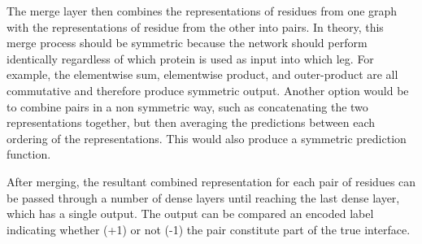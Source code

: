The merge layer then combines the representations of residues from one graph with the representations of residue from the other into pairs. 
In theory, this merge process should be symmetric because the network should perform identically regardless of which protein is used as input into which leg.
For example, the elementwise sum, elementwise product, and outer-product are all commutative and therefore produce symmetric output.
Another option would be to combine pairs in a non symmetric way, such as concatenating the two representations together, but then averaging the predictions between each ordering of the representations.
This would also produce a symmetric prediction function.

After merging, the resultant combined representation for each pair of residues can be passed through a number of dense layers until reaching the last dense layer, which has a single output.
The output can be compared an encoded label indicating whether (+1) or not (-1) the pair constitute part of the true interface. 


